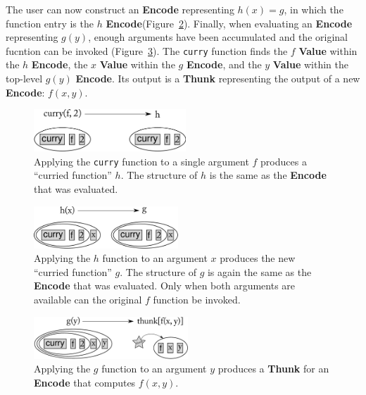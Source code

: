 \documentclass{article}
\newcommand{\valuex}{\textbf{Value}\xspace}
\newcommand{\encode}{\textbf{Encode}\xspace}
\newcommand{\thunk}{\textbf{Thunk}\xspace}
\begin{document}
The user can now construct an \encode representing $h(x) = g$, in
which the function entry is the $h$ \encode (Figure~\ref{fig:curry2}).
Finally, when evaluating an \encode representing $g(y)$, enough
arguments have been accumulated and the original fucntion can be
invoked (Figure~\ref{fig:curry3}). The \texttt{curry} function finds
the $f$ \valuex within the $h$ \encode, the $x$ \valuex within the $g$
\encode, and the $y$ \valuex within the top-level $g(y)$ \encode.  Its
output is a \thunk representing the output of a new \encode: $f(x,y)$.

\begin{figure}[h!]
  \begin{centering}
    \includegraphics[height=60px]{curry1.pdf}

  \end{centering}

  \caption{Applying the \texttt{curry} function to a single argument $f$ produces a ``curried function'' $h$. The structure of $h$ is the same as the \encode that was evaluated.}
  \label{fig:curry1}
\end{figure}

\begin{figure}[h!]
  \begin{centering}
    \includegraphics[height=60px]{curry2.pdf}

  \end{centering}

  \caption{Applying the $h$ function to an argument $x$ produces the new ``curried function'' $g$. The structure of $g$ is again the same as the \encode that was evaluated. Only
  when both arguments are available can the original $f$ function be invoked.}
  \label{fig:curry2}
\end{figure}

\begin{figure}[h!]
  \begin{centering}
    \includegraphics[height=60px]{curry3.pdf}

  \end{centering}

  \caption{Applying the $g$ function to an argument $y$ produces a \thunk for an \encode that computes $f(x, y)$.}
  \label{fig:curry3}
\end{figure}
\end{document}
